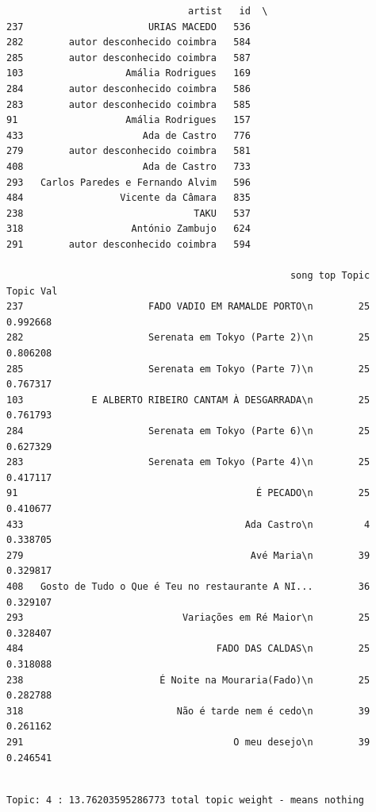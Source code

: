 \documentclass[11pt]{article}
\begin{document}
    
    \begin{verbatim}
                                artist   id  \
237                      URIAS MACEDO   536   
282        autor desconhecido coimbra   584   
285        autor desconhecido coimbra   587   
103                  Amália Rodrigues   169   
284        autor desconhecido coimbra   586   
283        autor desconhecido coimbra   585   
91                   Amália Rodrigues   157   
433                     Ada de Castro   776   
279        autor desconhecido coimbra   581   
408                     Ada de Castro   733   
293   Carlos Paredes e Fernando Alvim   596   
484                 Vicente da Câmara   835   
238                              TAKU   537   
318                   António Zambujo   624   
291        autor desconhecido coimbra   594   

                                                  song top Topic  Topic Val  
237                      FADO VADIO EM RAMALDE PORTO\n        25   0.992668  
282                      Serenata em Tokyo (Parte 2)\n        25   0.806208  
285                      Serenata em Tokyo (Parte 7)\n        25   0.767317  
103            E ALBERTO RIBEIRO CANTAM À DESGARRADA\n        25   0.761793  
284                      Serenata em Tokyo (Parte 6)\n        25   0.627329  
283                      Serenata em Tokyo (Parte 4)\n        25   0.417117  
91                                          É PECADO\n        25   0.410677  
433                                       Ada Castro\n         4   0.338705  
279                                        Avé Maria\n        39   0.329817  
408   Gosto de Tudo o Que é Teu no restaurante A NI...        36   0.329107  
293                            Variações em Ré Maior\n        25   0.328407  
484                                  FADO DAS CALDAS\n        25   0.318088  
238                        É Noite na Mouraria(Fado)\n        25   0.282788  
318                           Não é tarde nem é cedo\n        39   0.261162  
291                                     O meu desejo\n        39   0.246541  
    \end{verbatim}

    
    \begin{Verbatim}[commandchars=\\\{\}]

Topic: 4 : 13.76203595286773 total topic weight - means nothing

    \end{Verbatim}
\end{document}
